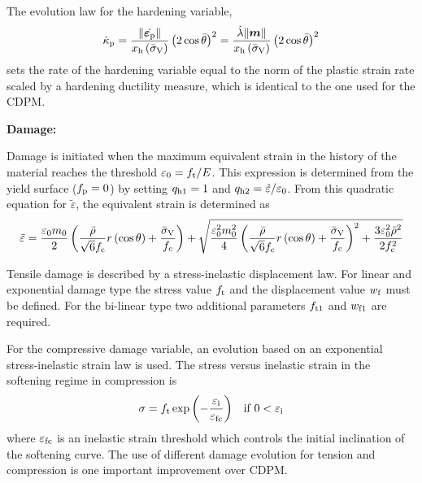 \documentclass[a4paper]{article}
\newcommand{\mbf}[1]{\mbox{\boldmath$#1$}}
\newcommand{\veps}{\mbf{\varepsilon}}  %
\begin{document}
The evolution law for the hardening variable,
\begin{equation}
\dot{\kappa}_{\rm {p}} = \frac {\| \dot{\veps_{\rm{p}}}\|}{x_{\rm{h}}\left(\bar{\sigma}_{\rm V} \right)} \left(2 \cos{\bar{\theta}}\right)^2 = \frac {\dot{\lambda} \| \mbf{m}\|}{x_{\rm{h}}\left(\bar{\sigma}_{\rm V} \right)} \left(2\cos{\bar{\theta}}\right)^2
\end{equation}
sets the rate of the hardening variable equal to the norm of the plastic strain rate scaled by a hardening ductility measure, which is identical to the one used for the CDPM.

\noindent\textbf{Damage:}

Damage is initiated when the maximum equivalent strain in the history of the material reaches the threshold $\varepsilon_{0} = f_{\rm t}/E$. 
This expression is determined from the yield surface ($f_{\rm p} = 0$) by setting $q_{\rm {h1}}=1$ and $q_{\rm{h2}} = \tilde{\varepsilon}/\varepsilon_{0}$.
From this quadratic equation for $\tilde{\varepsilon}$, the equivalent strain is determined as
\begin{equation}
\tilde{\varepsilon} = \dfrac{\varepsilon_0 m_0}{2}  \left(\dfrac{\bar{\rho}}{\sqrt{6} f_{\rm c}} r\left(\cos\theta\right) + \dfrac{\bar{\sigma}_{\rm V}}{f_{c}}\right) + \sqrt{\dfrac{\varepsilon_0^2 m_0^2}{4} \left(\dfrac{\bar{\rho}}{\sqrt{6}f_{\rm c}} r\left(\cos\theta\right) + \dfrac{\bar{\sigma}_{\rm V}}{f_{\rm c}}\right)^2 + \dfrac{3 \varepsilon_0^2 \bar{\rho}^2}{2 f_{\rm c}^2}}
\end{equation}

Tensile damage is described by a stress-inelastic displacement law. For linear and exponential damage type the stress value $f_{\rm t}$ and the displacement value $w_{\rm f}$ must be defined. For the bi-linear type two additional parameters $f_{\rm t1}$ and  $w_{\rm f1}$ are required.
 
For the compressive damage variable, an evolution based on an exponential stress-inelastic strain law is used. The stress versus inelastic strain in the softening regime in compression is
\begin{equation}
\begin{array}{ll}
\sigma = f_{\rm t} \exp\left(-\dfrac{\varepsilon_{\rm i}}{\varepsilon_{\rm fc}}\right) & \mbox{if $0 < \varepsilon_{\rm i}$}
\end{array}
\end{equation}
where $\varepsilon_{\rm fc}$ is an inelastic strain threshold which controls the initial inclination of the softening curve. The use of different damage evolution for tension and compression is one important improvement over CDPM.
\end{document}
